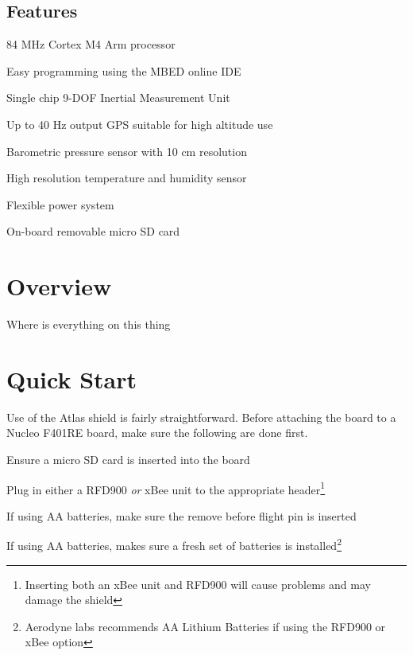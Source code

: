 \documentclass[letterpaper,twoside]{article}
\begin{document}
\begin{multicols}{2}
\vfill
\columnbreak

\section*{Features}
\begin{itemize*}
	\item 84 MHz Cortex M4 Arm processor
	\item Easy programming using the MBED online IDE 
	\item Single chip 9-DOF Inertial Measurement Unit
	\item Up to 40 Hz output GPS suitable for high altitude use
	\item Barometric pressure sensor with 10 cm resolution
	\item High resolution temperature and humidity sensor
	\item Flexible power system
	\item On-board removable micro SD card
\end{itemize*}

\end{multicols}

\newpage

\tableofcontents

\section{Overview}
Where is everything on this thing

\section{Quick Start}
Use of the Atlas shield is fairly straightforward.  Before attaching the board to a Nucleo F401RE board, make sure the following are done first.
\begin{itemize*}
	\item Ensure a micro SD card is inserted into the board
	\item Plug in either a RFD900 \emph{or} xBee unit to the appropriate header\footnote{Inserting both an xBee unit and RFD900 will cause problems and may damage the shield}
	\item If using AA batteries, make sure the remove before flight pin is inserted
	\item If using AA batteries, makes sure a fresh set of batteries is installed\footnote{Aerodyne labs recommends AA Lithium Batteries if using the RFD900 or xBee option}
\end{itemize*}
\end{document}
